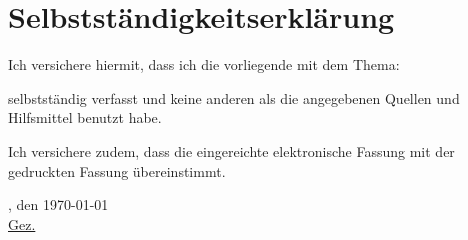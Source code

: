 \chapter*{Selbstständigkeitserklärung}

Ich versichere hiermit, dass ich die vorliegende \arbeit{} mit dem Thema:
\begin{quote}
	\textit{\titel}
\end{quote}
selbstständig verfasst und keine anderen als die angegebenen Quellen und Hilfsmittel benutzt habe.

\vspace{0.25cm}

Ich versichere zudem, dass die eingereichte elektronische Fassung mit der gedruckten Fassung übereinstimmt.

\vspace{1cm}

\verfassungsort, den \today \\[0.5cm]
	{\underline{Gez. \autor}}
	{\makebox[6cm]{\hrulefill}}\\ 
\autorReverse
